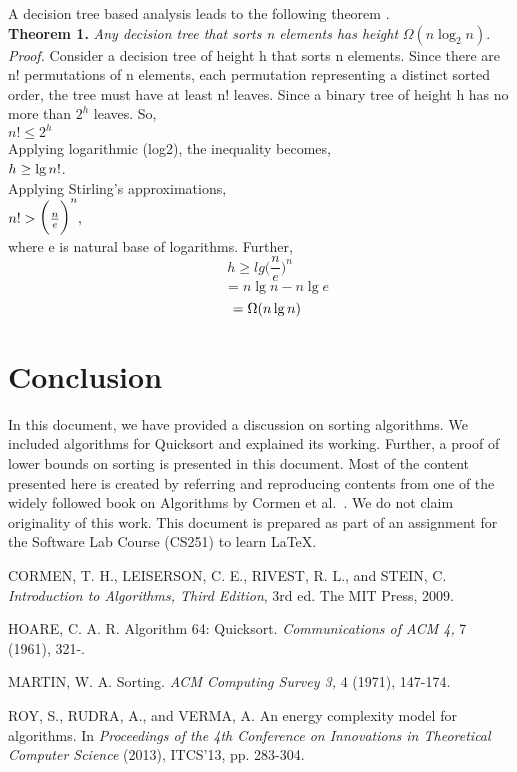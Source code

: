 \documentclass[a4paper, 10pt,twocolumn]{article}
\begin{document}
A decision tree based analysis leads to the following theorem \cite{one}.\\

\noindent
\textbf{Theorem 1.} \textit{Any decision tree that sorts n elements has height} $\Omega(n\log_2{n}).$\\

\noindent
\textit{Proof.} Consider a decision tree of height h that sorts n elements. Since there are n! permutations of n elements, each permutation representing a distinct sorted order, the tree must have at least n! leaves. Since a binary tree of height h has no more than $2^h$ leaves. So,\\
$n! \leq 2^h$\\

\noindent
Applying logarithmic (log2), the inequality becomes,\\
$\large h \geq \lg{n!}$.\\
Applying Stirling's approximations,\\
$\Large n! > \Big( \frac{n}{e} \Big) ^n ,$\\
where e is natural base of logarithms. Further,\\
$$h \geq lg\Big( \frac{n}{e} \Big) ^n$$
$$\hspace{1cm}= n\lg{n} - n\lg{e}$$
$$\hspace{0.35cm}= \Omega(n\lg{n})$$

\section{Conclusion}
In this document, we have provided a discussion on sorting algorithms. We included algorithms for Quicksort and explained its working. Further, a proof of lower bounds on sorting is presented in this document. Most of the content presented here is created by referring and reproducing contents from one of the widely followed book on Algorithms by Cormen et al.~\cite{one}. We do not claim originality of this work. This document is prepared as part of an assignment for the Software Lab Course (CS251) to learn \LaTeX.

\begin{thebibliography}{20}

C{\fontsize{7}{10}\selectfont ORMEN}, T. H., L{\fontsize{8}{10}\selectfont EISERSON}, C. E., R{\fontsize{8}{10}\selectfont IVEST}, R. L., and S{\fontsize{8}{10}\selectfont TEIN}, C. \textit{Introduction to Algorithms, Third Edition}, 3rd ed. The MIT Press, 2009.

H{\fontsize{8}{10}\selectfont OARE}, C. A. R. Algorithm 64: Quicksort. \textit{Communications of ACM 4,} 7 (1961), 321-.

M{\fontsize{7}{10}\selectfont ARTIN}, W. A. Sorting. \textit{ACM Computing Survey 3,} 4 (1971), 147-174.

R{\fontsize{7}{10}\selectfont OY}, S., R{\fontsize{7}{10}\selectfont UDRA}, A., and V{\fontsize{7}{10}\selectfont ERMA}, A. An energy complexity model for algorithms. In \textit{Proceedings of the 4th Conference on Innovations in Theoretical Computer Science} (2013), ITCS'13, pp. 283-304.

\end{thebibliography}
\end{document}
